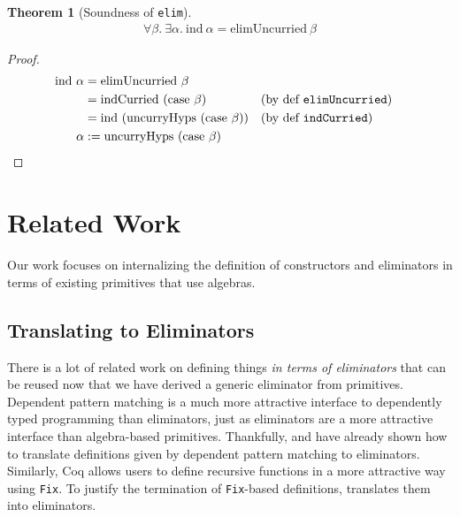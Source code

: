\documentclass[preprint,nonatbib]{sigplanconf}
\newtheorem*{mythm}{Theorem}
\begin{document}
\begin{mythm}[Soundness of {\tt elim}]
\label{thm:soundness}
\begin{align*}
\forall \beta. ~ \exists \alpha.
~ \textrm{ind} ~ \alpha = \textrm{elimUncurried} ~ \beta
\end{align*}
\end{mythm}

\begin{proof}
\begin{align*}
\textrm{ind} ~ \alpha &= \textrm{elimUncurried} ~ \beta& && \\
&=\textrm{indCurried} ~ ( \textrm{case} ~ \beta ) && \text{(by def {\tt elimUncurried})} \\
&= \textrm{ind} ~ ( \textrm{uncurryHyps} ~ ( \textrm{case} ~ \beta ) ) && \text{(by def {\tt indCurried})} \\
\alpha &:= \textrm{uncurryHyps} ~ ( \textrm{case} ~ \beta )
\end{align*}
\end{proof}



\section{Related Work}
\label{sec:related-work}

Our work focuses on internalizing the definition of constructors and
eliminators in terms of existing primitives that use algebras. 

\subsection{Translating to Eliminators}

There is a lot of related work on defining things
{\it in terms of eliminators} that can be reused now that we have
derived a generic eliminator from primitives.
Dependent pattern matching is a much more attractive interface to
dependently typed programming than eliminators, just as eliminators
are a more attractive interface than algebra-based primitives.
Thankfully, \citet{Goguen06eliminatingdependent} and
\citet{McBride:2000:EM:646540.759262} have already shown how to
translate definitions given by dependent pattern matching to
eliminators.
Similarly, {\sc Coq} allows users to define recursive functions in a
more attractive way using {\tt Fix}. To justify the termination of
{\tt Fix}-based definitions, \citet{gimenez1995codifying} translates
them into eliminators. 
\end{document}
